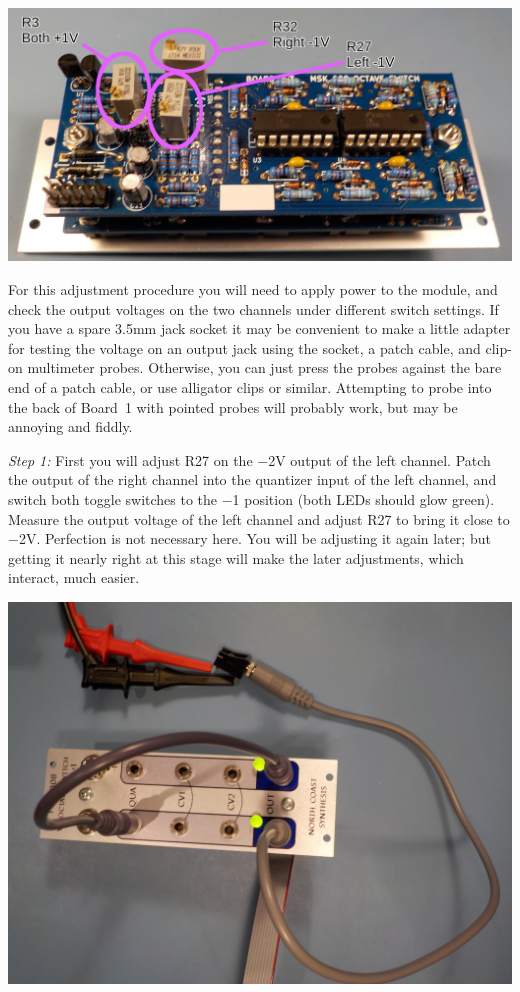 \noindent\includegraphics[width=\linewidth]{trimmer-ids.jpg}

For this adjustment procedure you will need to apply power to the module,
and check the output voltages on the two channels under different switch
settings.  If you have a spare 3.5mm jack socket it may be convenient to
make a little adapter for testing the voltage on an output jack using the
socket, a patch cable, and clip-on multimeter probes.  Otherwise, you can
just press the probes against the bare end of a patch cable, or use
alligator clips or similar.  Attempting to probe into the back of Board~1
with pointed probes will probably work, but may be annoying and fiddly.

\textit{Step 1:}  First you will adjust R27 on the $-$2V output of the left
channel.  Patch the output of
the right channel into the quantizer input of the left channel, and switch
both toggle switches to the $-$1 position (both LEDs should glow green). 
Measure the output voltage of the left channel and adjust R27 to bring it
close to $-$2V.  Perfection is not necessary here.  You will be adjusting it
again later; but getting it nearly right at this stage will make the later
adjustments, which interact, much easier.

\noindent\includegraphics[width=\linewidth]{test-patch.jpg}

